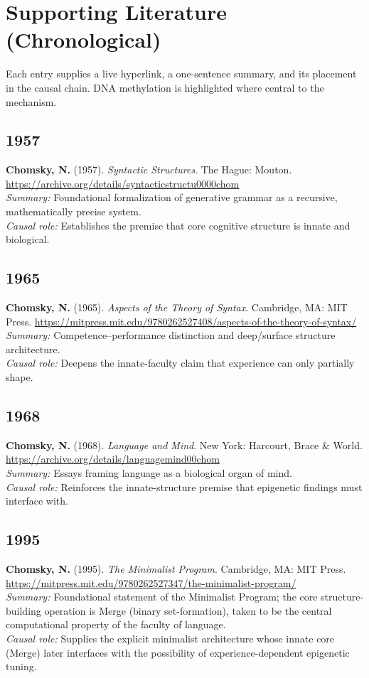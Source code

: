 \documentclass[11pt,a4paper]{article}
\begin{document}
\section{Supporting Literature (Chronological)}
Each entry supplies a live hyperlink, a one-sentence summary, and its placement in the causal chain. DNA methylation is highlighted where central to the mechanism.

\subsection*{1957}
\textbf{Chomsky, N.} (1957). \textit{Syntactic Structures}. The Hague: Mouton.  
\url{https://archive.org/details/syntacticstructu0000chom}\\
\textit{Summary:} Foundational formalization of generative grammar as a recursive, mathematically precise system.\\
\textit{Causal role:} Establishes the premise that core cognitive structure is innate and biological.

\subsection*{1965}
\textbf{Chomsky, N.} (1965). \textit{Aspects of the Theory of Syntax}. Cambridge, MA: MIT Press.  
\url{https://mitpress.mit.edu/9780262527408/aspects-of-the-theory-of-syntax/}\\
\textit{Summary:} Competence--performance distinction and deep/surface structure architecture.\\
\textit{Causal role:} Deepens the innate-faculty claim that experience can only partially shape.

\subsection*{1968}
\textbf{Chomsky, N.} (1968). \textit{Language and Mind}. New York: Harcourt, Brace \& World.  
\url{https://archive.org/details/languagemind00chom}\\
\textit{Summary:} Essays framing language as a biological organ of mind.\\
\textit{Causal role:} Reinforces the innate-structure premise that epigenetic findings must interface with.

\subsection*{1995}
\textbf{Chomsky, N.} (1995). \textit{The Minimalist Program}. Cambridge, MA: MIT Press.  
\url{https://mitpress.mit.edu/9780262527347/the-minimalist-program/}\\
\textit{Summary:} Foundational statement of the Minimalist Program; the core structure-building operation is Merge (binary set-formation), taken to be the central computational property of the faculty of language.\\
\textit{Causal role:} Supplies the explicit minimalist architecture whose innate core (Merge) later interfaces with the possibility of experience-dependent epigenetic tuning.
\end{document}

